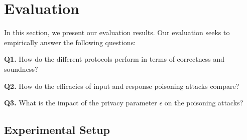 \vspace{-0.1cm}\section{Evaluation}\label{chap4-sec:eval}

In this section, we present our evaluation results. Our evaluation seeks to empirically answer the following questions:
\squishlist
    \item \textbf{Q1.} How do the different protocols perform in terms of correctness and soundness?
    \item \textbf{Q2.} How do the efficacies of input and response poisoning attacks compare?
    \item \textbf{Q3.} What is the impact of the privacy parameter $\epsilon$ on the poisoning attacks?
\squishend
  \vspace{-0.4cm}  \subsection{Experimental Setup}\label{chap4-sec:exp-setup}

